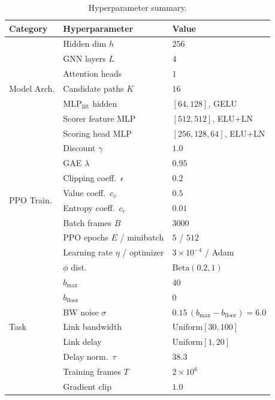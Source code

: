 \begin{table}[t]
\centering
\caption{Hyperparameter summary.}
\label{tab:hyperparam}
\setlength{\tabcolsep}{3pt}
\footnotesize
\begin{tabular}{p{1.6cm}p{3.6cm}p{2.8cm}}
\toprule
Category & Hyperparameter & Value \\
\midrule
\multirow{7}{*}{Model Arch.}
 & Hidden dim $h$              & $256$ \\
 & GNN layers $L$            & $4$ \\
 & Attention heads             & $1$ \\
 & Candidate paths $K$          & $16$ \\
 & $\mathrm{MLP}_{\text{lift}}$ hidden & $[64,128]$, GELU \\
 & Scorer feature MLP         & $[512,512]$, ELU$+$LN \\
 & Scoring head MLP             & $[256,128,64]$, ELU$+$LN \\
\midrule
\multirow{8}{*}{PPO Train.}
 & Discount $\gamma$           & $1.0$ \\
 & GAE $\lambda$          & $0.95$ \\
 & Clipping coeff.\ $\epsilon$     & $0.2$ \\
 & Value coeff.\ $c_v$          & $0.5$ \\
 & Entropy coeff.\ $c_e$            & $0.01$ \\
 & Batch frames $B$            & $3000$ \\
 & PPO epochs $E$ / minibatch & $5$ / $512$ \\
 & Learning rate $\eta$ / optimizer   & $3\times10^{-4}$ / Adam \\
\midrule
\multirow{9}{*}{Task}
 & $\phi$ dist.                & $\text{Beta}(0.2, 1)$ \\
 & $b_{\text{max}}$            & $40$ \\
 & $b_{\text{floor}}$          & $0$ \\
 & BW noise $\sigma$           & $0.15\,(b_{\text{max}}\!-\!b_{\text{floor}})\!=\!6.0$ \\
 & Link bandwidth              & $\text{Uniform}[30,100]$ \\
 & Link delay                  & $\text{Uniform}[1,20]$ \\
 & Delay norm.\ $\tau$          & $38.3$ \\
 & Training frames $T$         & $2\times10^{6}$ \\
 & Gradient clip               & $1.0$ \\
\bottomrule
\end{tabular}
\end{table}

